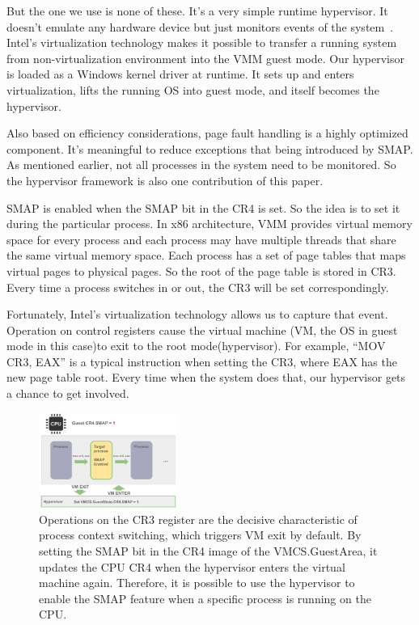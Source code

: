 But the one we use is none of these. It's a very simple runtime hypervisor. It doesn't emulate any hardware device but just monitors events of the system~\cite{howtohide}. Intel's virtualization technology makes it possible to transfer a running system from non-virtualization environment into the VMM guest mode. Our hypervisor is loaded as a Windows kernel driver at runtime. It sets up and enters virtualization, lifts the running OS into guest mode, and itself becomes the hypervisor.  

Also based on efficiency considerations, page fault handling is a highly optimized component. It's meaningful to reduce exceptions that being introduced by SMAP. As mentioned earlier, not all processes in the system need to be monitored. So the hypervisor framework is also one contribution of this paper. 

SMAP is enabled when the SMAP bit in the CR4 is set. So the idea is to set it during the particular process. In x86 architecture, VMM provides virtual memory space for every process and each process may have multiple threads that share the same virtual memory space. Each process has a set of page tables that maps virtual pages to physical pages. So the root of the page table is stored in CR3. Every time a process switches in or out, the CR3 will be set correspondingly.

Fortunately, Intel's virtualization technology allows us to capture that event. Operation on control registers cause the virtual machine (VM, the OS in guest mode in this case)to exit to the root mode(hypervisor). For example, ``MOV CR3, EAX'' is a typical instruction when setting the CR3, where EAX has the new page table root. Every time when the system does that, our hypervisor gets a chance to get involved.

\begin{figure}[th]
  \includegraphics[width=0.40\textwidth]{figures/processmap3}
  \centering
  \caption{Operations on the CR3 register are the decisive characteristic of process context switching, which triggers VM exit by default. By setting the SMAP bit in the CR4 image of the VMCS.GuestArea, it updates the CPU CR4 when the hypervisor enters the virtual machine again. Therefore, it is possible to use the hypervisor to enable the SMAP feature when a specific process is running on the CPU.}
  \label{fig:processmap}
\end{figure}

